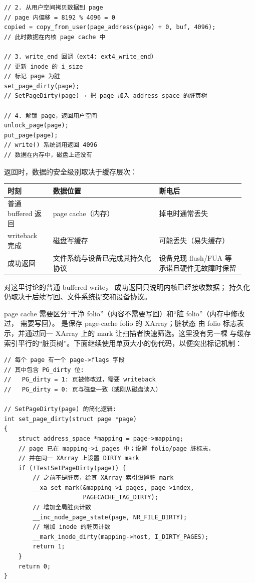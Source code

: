 \begin{filesystemlayout}
\begin{lstlisting}
// 2. 从用户空间拷贝数据到 page
// page 内偏移 = 8192 % 4096 = 0
copied = copy_from_user(page_address(page) + 0, buf, 4096);
// 此时数据在内核 page cache 中

// 3. write_end 回调（ext4: ext4_write_end）
// 更新 inode 的 i_size
// 标记 page 为脏
set_page_dirty(page);
// SetPageDirty(page) → 把 page 加入 address_space 的脏页树

// 4. 解锁 page，返回用户空间
unlock_page(page);
put_page(page);
// write() 系统调用返回 4096
// 数据在内存中，磁盘上还没有
\end{lstlisting}

 返回时，数据的安全级别取决于缓存层次：

\begin{longtable}{|F{0.18\linewidth}|F{0.42\linewidth}|F{0.34\linewidth}|}
\toprule
{}
时刻 & 数据位置 & 断电后 \\
\midrule
普通 buffered  返回 & page cache（内存） & 掉电时通常丢失 \\\tablerowrule
writeback 完成 & 磁盘写缓存 & 可能丢失（易失缓存） \\\tablerowrule
{} 成功返回 & 文件系统与设备已完成其持久化协议 & 设备兑现 flush/FUA 等承诺且硬件无故障时保留 \\
\bottomrule
\end{longtable}

对这里讨论的普通 buffered write， 成功返回只说明内核已经接收数据；
持久化仍取决于后续写回、文件系统提交和设备协议。


page cache 需要区分“干净 folio”（内容不需要写回）和“脏 folio”（内存中修改过，
需要写回）。 是保存 page-cache folio 的 XArray；脏状态
由 folio 标志表示，并通过同一 XArray 上的 mark 让扫描者快速筛选。这里没有另一棵
与缓存索引平行的“脏页树”。下面继续使用单页大小的伪代码，以便突出标记机制：

\begin{lstlisting}
// 每个 page 有一个 page->flags 字段
// 其中包含 PG_dirty 位:
//   PG_dirty = 1: 页被修改过，需要 writeback
//   PG_dirty = 0: 页与磁盘一致（或刚从磁盘读入）

// SetPageDirty(page) 的简化逻辑:
int set_page_dirty(struct page *page)
{
    struct address_space *mapping = page->mapping;
    // page 已在 mapping->i_pages 中；设置 folio/page 脏标志，
    // 并在同一 XArray 上设置 DIRTY mark
    if (!TestSetPageDirty(page)) {
        // 之前不是脏页，给其 XArray 索引设置脏 mark
        __xa_set_mark(&mapping->i_pages, page->index,
                      PAGECACHE_TAG_DIRTY);
        // 增加全局脏页计数
        __inc_node_page_state(page, NR_FILE_DIRTY);
        // 增加 inode 的脏页计数
        __mark_inode_dirty(mapping->host, I_DIRTY_PAGES);
        return 1;
    }
    return 0;
}
\end{lstlisting}


\end{filesystemlayout}
